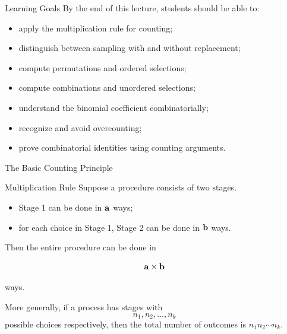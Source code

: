 \setcounter{framenumber}{0}


\begin{frame}
  \titlepage
\end{frame}

\begin{frame}{Learning Goals}
By the end of this lecture, students should be able to:

\begin{itemize}
    \item apply the multiplication rule for counting;
    \item distinguish between sampling with and without replacement;
    \item compute permutations and ordered selections;
    \item compute combinations and unordered selections;
    \item understand the binomial coefficient combinatorially;
    \item recognize and avoid overcounting;
    \item prove combinatorial identities using counting arguments.
\end{itemize}
\end{frame}


\begin{frame}{The Basic Counting Principle}
\begin{keybox}{Multiplication Rule}
Suppose a procedure consists of two stages.

\begin{itemize}
    \item Stage 1 can be done in $\bf 
    a$ ways;
    \item for each choice in Stage 1, Stage 2 can be done in $\bf b$ ways.
\end{itemize}

Then the entire procedure can be done in

\[
\bf a \times  b
\]

ways.
\end{keybox}

More generally, if a process has stages with
\[
n_1,n_2,\dots,n_k
\]
possible choices respectively, then the total number of outcomes is $n_1n_2\cdots n_k.$

\end{frame}

